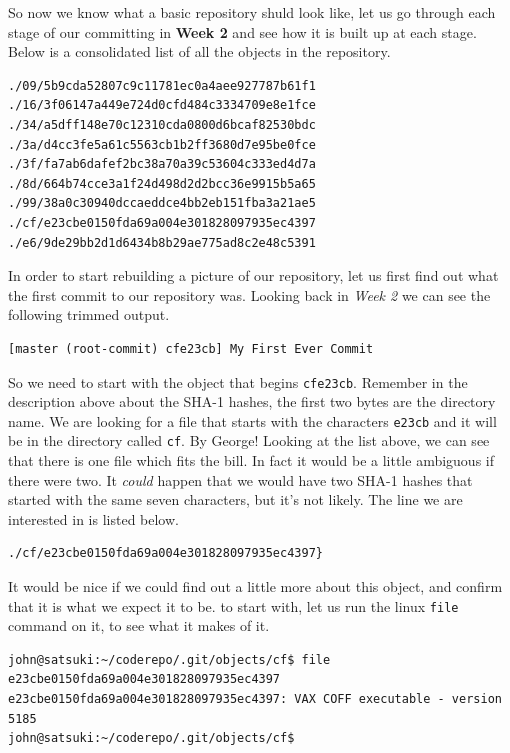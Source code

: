 So now we know what a basic repository shuld look like, let us go through each stage of our committing in \textbf{Week 2} and see how it is built up at each stage.  Below is a consolidated list of all the objects in the repository.  

\begin{Verbatim}[frame=leftline,framerule=1mm,fontsize=\relsize{-3}]
./09/5b9cda52807c9c11781ec0a4aee927787b61f1
./16/3f06147a449e724d0cfd484c3334709e8e1fce
./34/a5dff148e70c12310cda0800d6bcaf82530bdc
./3a/d4cc3fe5a61c5563cb1b2ff3680d7e95be0fce
./3f/fa7ab6dafef2bc38a70a39c53604c333ed4d7a
./8d/664b74cce3a1f24d498d2d2bcc36e9915b5a65
./99/38a0c30940dccaeddce4bb2eb151fba3a21ae5
./cf/e23cbe0150fda69a004e301828097935ec4397
./e6/9de29bb2d1d6434b8b29ae775ad8c2e48c5391
\end{Verbatim}

In order to start rebuilding a picture of our repository, let us first find out what the first commit to our repository was.  Looking back in \emph{Week 2} we can see the following trimmed output.

\begin{Verbatim}[frame=leftline,framerule=1mm,fontsize=\relsize{-3}]
[master (root-commit) cfe23cb] My First Ever Commit
\end{Verbatim}

So we need to start with the object that begins \texttt{cfe23cb}.  Remember in the description above about the SHA-1 hashes, the first two bytes are the directory name.  We are looking for a file that starts with the characters \texttt{e23cb} and it will be in the directory called \texttt{cf}.  By George!  Looking at the list above, we can see that there is one file which fits the bill.  In fact it would be a little ambiguous if there were two.  It \emph{could} happen that we would have two SHA-1 hashes  that started with the same seven characters, but it's not likely.  The line we are interested in is listed below.

\begin{Verbatim}[frame=leftline,framerule=1mm,fontsize=\relsize{-3}]
./cf/e23cbe0150fda69a004e301828097935ec4397}
\end{Verbatim}

It would be nice if we could find out a little more about this object, and confirm that it is what we expect it to be.  to start with, let us run the linux \texttt{file} command on it, to see what it makes of it.

\begin{Verbatim}[frame=leftline,framerule=1mm,fontsize=\relsize{-3}]
john@satsuki:~/coderepo/.git/objects/cf$ file e23cbe0150fda69a004e301828097935ec4397 
e23cbe0150fda69a004e301828097935ec4397: VAX COFF executable - version 5185
john@satsuki:~/coderepo/.git/objects/cf$ 
\end{Verbatim}

